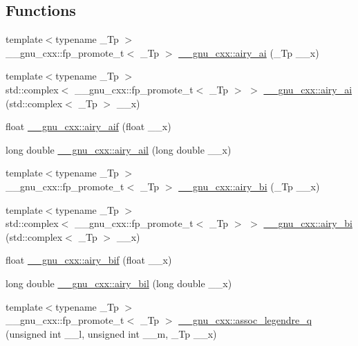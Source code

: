 \subsection*{Functions}
\begin{DoxyCompactItemize}
\item 
{\footnotesize template$<$typename \+\_\+\+Tp $>$ }\\\+\_\+\+\_\+gnu\+\_\+cxx\+::fp\+\_\+promote\+\_\+t$<$ \+\_\+\+Tp $>$ \hyperlink{group__mathsf__gnu_gac84f8c4ad00ee677ad4d0b785925d983}{\+\_\+\+\_\+gnu\+\_\+cxx\+::airy\+\_\+ai} (\+\_\+\+Tp \+\_\+\+\_\+x)
\item 
{\footnotesize template$<$typename \+\_\+\+Tp $>$ }\\std\+::complex$<$ \+\_\+\+\_\+gnu\+\_\+cxx\+::fp\+\_\+promote\+\_\+t$<$ \+\_\+\+Tp $>$ $>$ \hyperlink{group__mathsf__gnu_gacf37e6c9f186ade270b476c8e5826fb9}{\+\_\+\+\_\+gnu\+\_\+cxx\+::airy\+\_\+ai} (std\+::complex$<$ \+\_\+\+Tp $>$ \+\_\+\+\_\+x)
\item 
float \hyperlink{group__mathsf__gnu_gaf317ba724c44b3a8271fe341d9870173}{\+\_\+\+\_\+gnu\+\_\+cxx\+::airy\+\_\+aif} (float \+\_\+\+\_\+x)
\item 
long double \hyperlink{group__mathsf__gnu_ga800fdb61c672ae1831f4ca4250d657de}{\+\_\+\+\_\+gnu\+\_\+cxx\+::airy\+\_\+ail} (long double \+\_\+\+\_\+x)
\item 
{\footnotesize template$<$typename \+\_\+\+Tp $>$ }\\\+\_\+\+\_\+gnu\+\_\+cxx\+::fp\+\_\+promote\+\_\+t$<$ \+\_\+\+Tp $>$ \hyperlink{group__mathsf__gnu_ga33c172cab7f8e9c99537444c7e30801a}{\+\_\+\+\_\+gnu\+\_\+cxx\+::airy\+\_\+bi} (\+\_\+\+Tp \+\_\+\+\_\+x)
\item 
{\footnotesize template$<$typename \+\_\+\+Tp $>$ }\\std\+::complex$<$ \+\_\+\+\_\+gnu\+\_\+cxx\+::fp\+\_\+promote\+\_\+t$<$ \+\_\+\+Tp $>$ $>$ \hyperlink{group__mathsf__gnu_ga27cfc90cf84fae2acb2d55a9409ea49c}{\+\_\+\+\_\+gnu\+\_\+cxx\+::airy\+\_\+bi} (std\+::complex$<$ \+\_\+\+Tp $>$ \+\_\+\+\_\+x)
\item 
float \hyperlink{group__mathsf__gnu_ga2ade465827bdba7370abbcce78e54912}{\+\_\+\+\_\+gnu\+\_\+cxx\+::airy\+\_\+bif} (float \+\_\+\+\_\+x)
\item 
long double \hyperlink{group__mathsf__gnu_ga59240b3f40177e5187f3f194f624f0f8}{\+\_\+\+\_\+gnu\+\_\+cxx\+::airy\+\_\+bil} (long double \+\_\+\+\_\+x)
\item 
{\footnotesize template$<$typename \+\_\+\+Tp $>$ }\\\+\_\+\+\_\+gnu\+\_\+cxx\+::fp\+\_\+promote\+\_\+t$<$ \+\_\+\+Tp $>$ \hyperlink{group__mathsf__gnu_ga96a1223727fa71ffbf520a98ac3dc885}{\+\_\+\+\_\+gnu\+\_\+cxx\+::assoc\+\_\+legendre\+\_\+q} (unsigned int \+\_\+\+\_\+l, unsigned int \+\_\+\+\_\+m, \+\_\+\+Tp \+\_\+\+\_\+x)

\end{DoxyCompactItemize}
